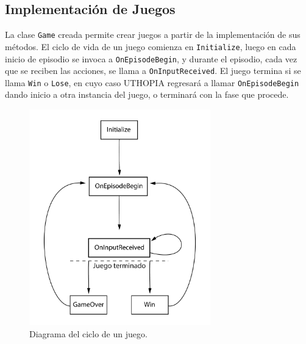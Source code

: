 \subsection{Implementación de Juegos}
 
La clase \lstinline{Game} creada permite crear juegos a partir de la implementación de sus métodos. El ciclo de vida de un juego comienza en \lstinline{Initialize}, luego en cada inicio de episodio se invoca a \lstinline{OnEpisodeBegin}, y durante el episodio, cada vez que se reciben las acciones, se llama a \lstinline{OnInputReceived}. El juego termina si se llama \lstinline{Win} o \lstinline{Lose}, en cuyo caso UTHOPIA regresará a llamar \lstinline{OnEpisodeBegin} dando inicio a otra instancia del juego, o terminará con la fase que procede.
 
\begin{figure}[ht!]
    \centering
    \includegraphics[width=0.7\textwidth]{Graphics/uthopia_game_flow.png}
    \caption{Diagrama del ciclo de un juego.}
    \label{fig:cicle-of-games}
\end{figure}
 
\vspace*{1cm}
 
